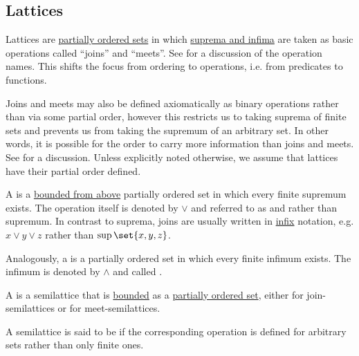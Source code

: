 \subsection{Lattices}\label{subsec:lattices}

\begin{definition}\label{def:semilattice}
  Lattices are \hyperref[def:partially_ordered_set]{partially ordered sets} in which \hyperref[def:partially_ordered_set_extremal_points/supremum_and_infimum]{suprema and infima} are taken as basic operations called \enquote{joins} and \enquote{meets}. See  for a discussion of the operation names. This shifts the focus from ordering to operations, i.e. from predicates to functions.

  Joins and meets may also be defined axiomatically as binary operations rather than via some partial order, however this restricts us to taking suprema of finite sets and prevents us from taking the supremum of an arbitrary set. In other words, it is possible for the order to carry more information than joins and meets. See  for a discussion. Unless explicitly noted otherwise, we assume that lattices have their partial order defined.

  \begin{thmenum}[series=def:semilattice]
     A  is a \hyperref[def:partially_ordered_set_extremal_points/top_and_bottom]{bounded from above} partially ordered set in which every finite supremum exists. The operation itself is denoted by \( \vee \) and referred to as  and rather than supremum. In contrast to suprema, joins are usually written in \hyperref[rem:first_order_formula_conventions/infix]{infix} notation, e.g. \( x \vee y \vee z \) rather than \( \sup\set{ x, y, z } \).

     Analogously, a  is a partially ordered set in which every finite infimum exists. The infimum is denoted by \( \wedge \) and called .

     A  is a semilattice that is \hyperref[def:partially_ordered_set_extremal_points/top_and_bottom]{bounded} as a \hyperref[def:partially_ordered_set]{partially ordered set}, either  for join-semilattices or  for meet-semilattices.

     A semilattice is said to be  if the corresponding operation is defined for arbitrary sets rather than only finite ones.


\end{thmenum}
\end{definition}
